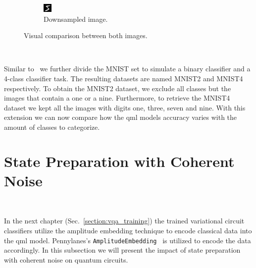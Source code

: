 \begin{figure}
\begin{subfigure}{0.35\textwidth}
    \includegraphics[width = \textwidth]{figures/resized.jpg}
    \caption{Downsampled image.}
  \end{subfigure}
  \caption{Visual comparison between both images.}\label{fig:mnist_resized}
\end{figure} \

Similar to~\cite{lu_quantum_2020} we further divide the MNIST
set to simulate a binary classifier and a 4-class classifier task. The
resulting datasets are named MNIST2 and MNIST4 respectively. To obtain
the MNIST2 dataset, we exclude all classes but the images that contain
a one or a nine. Furthermore, to retrieve the MNIST4 dataset we kept
all the images with digits one, three, seven and nine. With this extension
we can now compare how the \ac{qml} models accuracy varies with the
amount of classes to categorize. \

\section{State Preparation with Coherent Noise}\label{section:state_preparation_noise} \

In the next chapter (Sec.~\ref{section:vqa_training}) the trained variational circuit classifiers
utilize the amplitude embedding technique to encode classical data
into the \ac{qml} model. Pennylanes's \colorbox{inline_gray}{\lstinline|AmplitudeEmbedding|}~\cite{bergholm_pennylane_2022}
is utilized to encode the data accordingly. In this subsection we will
present the impact of state preparation with coherent noise on quantum
circuits. \

